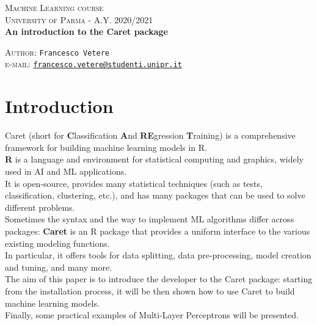 \documentclass{article}
\begin{document}
\begin{titlepage}
  \begin{center}
     \Large\textsc{Machine Learning course\\University of Parma - A.Y. 2020/2021}\\
     \vspace{1cm}
     \Large\textbf{An introduction to the Caret package}\\
     \vspace{1cm}
     
      \large{\textsc{Author}: \texttt{Francesco Vetere}\\ \small \textsc{e-mail:} \href{mailto:francesco.vetere@studenti.unipr.it}{\texttt{francesco.vetere@studenti.unipr.it}} }
  \end{center}
\end{titlepage}

\tableofcontents

\pagebreak

\section{Introduction}
Caret (short for \textbf{C}lassification \textbf{A}nd \textbf{RE}gression \textbf{T}raining) is a comprehensive framework for building machine learning models in R.\\

\textbf{R} is a language and environment for statistical computing and graphics, widely used in AI and ML applications.\\
It is open-source, provides many statistical techniques (such as tests, classification, clustering, etc.), and has many packages that can be used to solve different problems.\\

Sometimes the syntax and the way to implement ML algorithms differ across packages: \textbf{Caret} is an R package that provides a uniform interface to the various existing modeling functions.\\
In particular, it offers tools for data splitting, data pre-processing, model creation and tuning, and many more.\\

The aim of this paper is to introduce the developer to the Caret package: starting from the installation process, it will be then shown how to use Caret to build machine learning models.\\
Finally, some practical examples of Multi-Layer Perceptrons will be presented.\\
\end{document}

